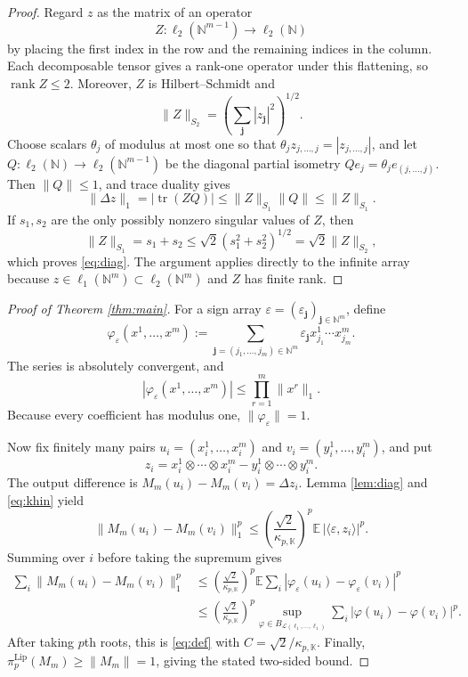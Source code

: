 \documentclass[11pt]{article}
\newcommand{\K}{\mathbb K}
\newcommand{\N}{\mathbb N}
\newcommand{\Lip}{\mathrm{Lip}}
\newcommand{\rank}{\operatorname{rank}}
\begin{document}
\begin{proof}
Regard $z$ as the matrix of an operator
\[
 Z:\ell_2(\N^{m-1})\longrightarrow\ell_2(\N)
\]
by placing the first index in the row and the remaining indices in the column.
Each decomposable tensor gives a rank-one operator under this flattening, so
$\rank Z\le2$.  Moreover, $Z$ is Hilbert--Schmidt and
\[
 \|Z\|_{S_2}=\left(\sum_{\mathbf j}|z_{\mathbf j}|^2\right)^{1/2}.
\]
Choose scalars $\theta_j$ of modulus at most one so that
$\theta_jz_{j,\ldots,j}=|z_{j,\ldots,j}|$, and let
$Q:\ell_2(\N)\to\ell_2(\N^{m-1})$ be the diagonal partial isometry
$Qe_j=\theta_j e_{(j,\ldots,j)}$.  Then $\|Q\|\le1$, and trace duality gives
\[
 \|\Delta z\|_1
 =|\operatorname{tr}(ZQ)|
 \le \|Z\|_{S_1}\|Q\|
 \le \|Z\|_{S_1}.
\]
If $s_1,s_2$ are the only possibly nonzero singular values of $Z$, then
\[
 \|Z\|_{S_1}=s_1+s_2
 \le\sqrt2(s_1^2+s_2^2)^{1/2}
 =\sqrt2\|Z\|_{S_2},
\]
which proves \eqref{eq:diag}.  The argument applies directly to the infinite
array because $z\in\ell_1(\N^m)\subset\ell_2(\N^m)$ and $Z$ has finite rank.
\end{proof}

\begin{proof}[Proof of Theorem \ref{thm:main}]
For a sign array $\varepsilon=(\varepsilon_{\mathbf j})_{\mathbf j\in\N^m}$,
define
\[
 \varphi_\varepsilon(x^1,\ldots,x^m)
 :=\sum_{\mathbf j=(j_1,\ldots,j_m)\in\N^m}
 \varepsilon_{\mathbf j}x^1_{j_1}\cdots x^m_{j_m}.
\]
The series is absolutely convergent, and
\[
 |\varphi_\varepsilon(x^1,\ldots,x^m)|
 \le \prod_{r=1}^m\|x^r\|_1.
\]
Because every coefficient has modulus one, $\|\varphi_\varepsilon\|=1$.

Now fix finitely many pairs
$u_i=(x_i^1,\ldots,x_i^m)$ and
$v_i=(y_i^1,\ldots,y_i^m)$, and put
\[
 z_i=x_i^1\otimes\cdots\otimes x_i^m
     -y_i^1\otimes\cdots\otimes y_i^m.
\]
The output difference is $M_m(u_i)-M_m(v_i)=\Delta z_i$.  Lemma
\ref{lem:diag} and \eqref{eq:khin} yield
\[
 \|M_m(u_i)-M_m(v_i)\|_1^p
 \le \left(\frac{\sqrt2}{\kappa_{p,\K}}\right)^p
 \mathbb E\,|\langle\varepsilon,z_i\rangle|^p.
\]
Summing over $i$ before taking the supremum gives
\begin{align*}
 \sum_i\|M_m(u_i)-M_m(v_i)\|_1^p
 &\le \left(\frac{\sqrt2}{\kappa_{p,\K}}\right)^p
 \mathbb E\sum_i
 |\varphi_\varepsilon(u_i)-\varphi_\varepsilon(v_i)|^p\\
 &\le \left(\frac{\sqrt2}{\kappa_{p,\K}}\right)^p
 \sup_{\varphi\in B_{\mathcal L(\ell_1,\ldots,\ell_1)}}
 \sum_i|\varphi(u_i)-\varphi(v_i)|^p.
\end{align*}
After taking $p$th roots, this is \eqref{eq:def} with
$C=\sqrt2/\kappa_{p,\K}$.  Finally,
$\pi_p^{\Lip}(M_m)\ge\|M_m\|=1$, giving the stated two-sided bound.
\end{proof}
\end{document}
